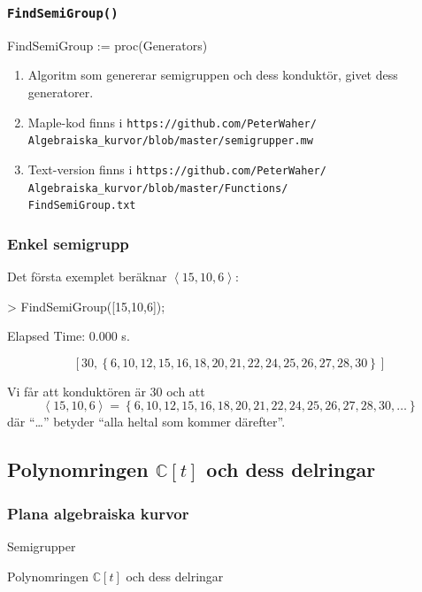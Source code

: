 \documentclass{beamer}
\begin{document}
\begin{frame}
	\frametitle{\texttt{FindSemiGroup()}}
	
	\begin{semiverbatim}
		FindSemiGroup := proc(Generators)
	\end{semiverbatim}
	
	\begin{enumerate}
		\item<1-> Algoritm som genererar semigruppen och dess konduktör, givet dess generatorer.

		\item<2-> Maple-kod finns i \texttt{https://github.com/PeterWaher/\\
			\qquad Algebraiska\_kurvor/blob/master/semigrupper.mw}
		
		\item<3-> Text-version finns i
		\texttt{https://github.com/PeterWaher/\\
			\qquad Algebraiska\_kurvor/blob/master/Functions/\\
			\qquad FindSemiGroup.txt} 
	\end{enumerate}
\end{frame}

\begin{frame}
	\frametitle{Enkel semigrupp}
	\begin{example}
		Det första exemplet beräknar $\left<15, 10, 6\right>$:

		\begin{semiverbatim}
			> FindSemiGroup([15,10,6]);
			
			
			Elapsed Time: 0.000 s.
		\end{semiverbatim}
		\[\left[30, \left\{6, 10, 12, 15, 16, 18, 20, 21, 22, 24, 25, 26, 27, 28, 30\right\}\right]\]

		
		Vi får att konduktören är $30$ och att 
		\[\left<15, 10, 6\right> = \left\{6, 10, 12, 15, 16, 18, 20, 21, 22, 24, 25, 26, 27, 28, 30, \ldots\right\}\]
		där ``\ldots'' betyder ``alla heltal som kommer därefter''.
	\end{example}
\end{frame}


\subsection{Polynomringen $\mathbb{C}[t]$ och dess delringar}

\begin{frame}
	\frametitle{Plana algebraiska kurvor}
	\begin{center}
		\Large Semigrupper
		
		Polynomringen $\mathbb{C}[t]$ och dess delringar
	\end{center}
\end{frame}
\end{document}
